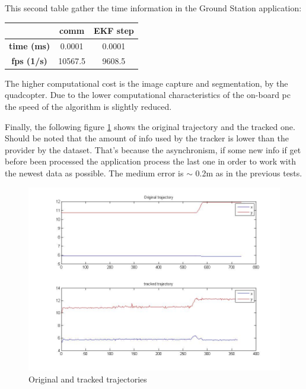 	This second table gather the time information in the Ground Station application:
	\newline
	
	{
	\centering
		\begin{tabular}{|c|c|c|}
		\hline  					&  comm		&  EKF step	\\
		\hline  \textbf{time (ms)}	& 	0.0001	& 	0.0001	\\
		\hline  \textbf{fps (1/s)}	&  	10567.5	&  	9608.5	\\
		\hline 
		\end{tabular} 
	}
	\newline
	
	The higher computational cost is the image capture and segmentation, by the quadcopter. Due to the lower computational characteristics of the on-board pc the speed of the algorithm is slightly reduced.
	
	Finally, the following figure \ref{fig:arch_trajs} shows the original trajectory and the tracked one. Should be noted that the amount of info used by the tracker is lower than the provider by the dataset. That's because the asynchronism, if some new info if get before been processed the application process the last one in order to work with the newest data as possible. The medium error is $\sim$ 0.2m as in the previous tests.
	
	\begin{figure}[ph]
		\centering
		\includegraphics[width=0.7\linewidth]{../Images/c4/arch_trajs}
		\caption{Original and tracked trajectories}
		\label{fig:arch_trajs}
	\end{figure}

	
